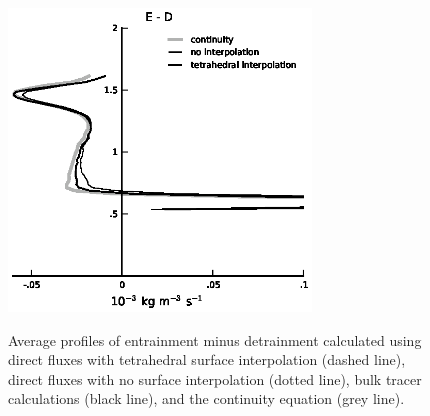\documentclass[12pt]{article}
\begin{document}
\begin{figure}[t]
  \noindent\includegraphics[width=19pc,angle=0]{./figures/E_minus_D_core}\\
  \caption{Average profiles of entrainment minus detrainment calculated using 
direct fluxes with tetrahedral surface interpolation (dashed line), direct 
fluxes with no surface interpolation (dotted line), bulk tracer calculations 
(black line), and the continuity equation (grey line).}\label{fig:E_minus_D}
\end{figure}
\end{document}
